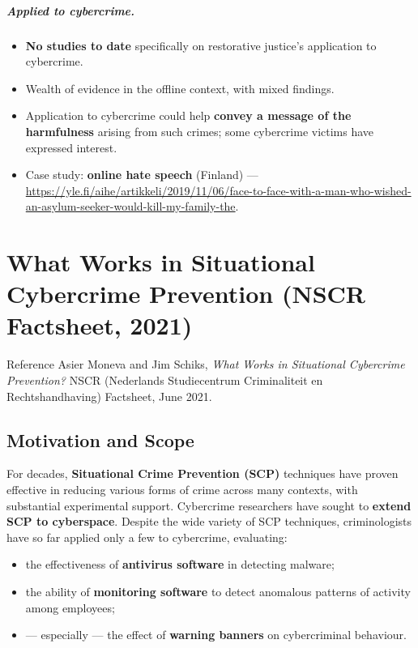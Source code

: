 \documentclass[11pt,a4paper,openany]{report}
\theoremstyle{definition}
\theoremstyle{plain}
\theoremstyle{remark}
\begin{document}
\paragraph{Applied to cybercrime.}
\begin{itemize}
    \item \textbf{No studies to date} specifically on restorative justice's application to cybercrime.
    \item Wealth of evidence in the offline context, with mixed findings.
    \item Application to cybercrime could help \textbf{convey a message of the harmfulness} arising from such crimes; some cybercrime victims have expressed interest.
    \item Case study: \textbf{online hate speech} (Finland) --- \url{https://yle.fi/aihe/artikkeli/2019/11/06/face-to-face-with-a-man-who-wished-an-asylum-seeker-would-kill-my-family-the}.
\end{itemize}


\chapter{What Works in Situational Cybercrime Prevention (NSCR Factsheet, 2021)}
\label{chap:scp-factsheet}

\begin{sourcebox}{Reference}
Asier Moneva and Jim Schiks, \textit{What Works in Situational Cybercrime Prevention?} NSCR (Nederlands Studiecentrum Criminaliteit en Rechtshandhaving) Factsheet, June 2021.
\end{sourcebox}

\section{Motivation and Scope}

For decades, \textbf{Situational Crime Prevention (SCP)} techniques have proven effective in reducing various forms of crime across many contexts, with substantial experimental support. Cybercrime researchers have sought to \textbf{extend SCP to cyberspace}. Despite the wide variety of SCP techniques, criminologists have so far applied only a few to cybercrime, evaluating:
\begin{itemize}
    \item the effectiveness of \textbf{antivirus software} in detecting malware;
    \item the ability of \textbf{monitoring software} to detect anomalous patterns of activity among employees;
    \item --- especially --- the effect of \textbf{warning banners} on cybercriminal behaviour.
\end{itemize}
\end{document}
